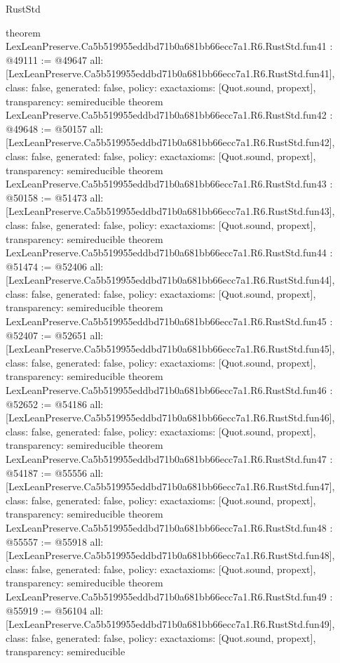 \begin{lexlean}{RustStd}
\begin{coremodule}
{}
theorem LexLeanPreserve.Ca5b519955eddbd71b0a681bb66ecc7a1.R6.RustStd.fun41 : @49111 := @49647 {
  all: [LexLeanPreserve.Ca5b519955eddbd71b0a681bb66ecc7a1.R6.RustStd.fun41],
  class: false,
  generated: false,
  policy: exact{axioms: [Quot.sound, propext]},
  transparency: semireducible
}
theorem LexLeanPreserve.Ca5b519955eddbd71b0a681bb66ecc7a1.R6.RustStd.fun42 : @49648 := @50157 {
  all: [LexLeanPreserve.Ca5b519955eddbd71b0a681bb66ecc7a1.R6.RustStd.fun42],
  class: false,
  generated: false,
  policy: exact{axioms: [Quot.sound, propext]},
  transparency: semireducible
}
theorem LexLeanPreserve.Ca5b519955eddbd71b0a681bb66ecc7a1.R6.RustStd.fun43 : @50158 := @51473 {
  all: [LexLeanPreserve.Ca5b519955eddbd71b0a681bb66ecc7a1.R6.RustStd.fun43],
  class: false,
  generated: false,
  policy: exact{axioms: [Quot.sound, propext]},
  transparency: semireducible
}
theorem LexLeanPreserve.Ca5b519955eddbd71b0a681bb66ecc7a1.R6.RustStd.fun44 : @51474 := @52406 {
  all: [LexLeanPreserve.Ca5b519955eddbd71b0a681bb66ecc7a1.R6.RustStd.fun44],
  class: false,
  generated: false,
  policy: exact{axioms: [Quot.sound, propext]},
  transparency: semireducible
}
theorem LexLeanPreserve.Ca5b519955eddbd71b0a681bb66ecc7a1.R6.RustStd.fun45 : @52407 := @52651 {
  all: [LexLeanPreserve.Ca5b519955eddbd71b0a681bb66ecc7a1.R6.RustStd.fun45],
  class: false,
  generated: false,
  policy: exact{axioms: [Quot.sound, propext]},
  transparency: semireducible
}
theorem LexLeanPreserve.Ca5b519955eddbd71b0a681bb66ecc7a1.R6.RustStd.fun46 : @52652 := @54186 {
  all: [LexLeanPreserve.Ca5b519955eddbd71b0a681bb66ecc7a1.R6.RustStd.fun46],
  class: false,
  generated: false,
  policy: exact{axioms: [Quot.sound, propext]},
  transparency: semireducible
}
theorem LexLeanPreserve.Ca5b519955eddbd71b0a681bb66ecc7a1.R6.RustStd.fun47 : @54187 := @55556 {
  all: [LexLeanPreserve.Ca5b519955eddbd71b0a681bb66ecc7a1.R6.RustStd.fun47],
  class: false,
  generated: false,
  policy: exact{axioms: [Quot.sound, propext]},
  transparency: semireducible
}
theorem LexLeanPreserve.Ca5b519955eddbd71b0a681bb66ecc7a1.R6.RustStd.fun48 : @55557 := @55918 {
  all: [LexLeanPreserve.Ca5b519955eddbd71b0a681bb66ecc7a1.R6.RustStd.fun48],
  class: false,
  generated: false,
  policy: exact{axioms: [Quot.sound, propext]},
  transparency: semireducible
}
theorem LexLeanPreserve.Ca5b519955eddbd71b0a681bb66ecc7a1.R6.RustStd.fun49 : @55919 := @56104 {
  all: [LexLeanPreserve.Ca5b519955eddbd71b0a681bb66ecc7a1.R6.RustStd.fun49],
  class: false,
  generated: false,
  policy: exact{axioms: [Quot.sound, propext]},
  transparency: semireducible
}
\end{coremodule}
\end{lexlean}
